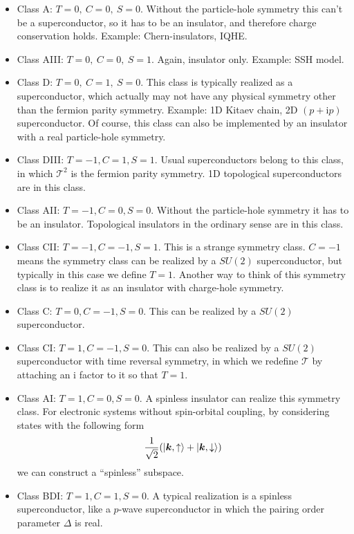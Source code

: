 \documentclass[hyperref, a4paper]{article}
\newcommand*{\ii}{\mathrm{i}}
\begin{document}
\begin{itemize}
    \item Class A: $T = 0, \  C = 0, \ S = 0$. Without the particle-hole symmetry this can't be a superconductor,
     so it has to be an insulator, and therefore charge conservation holds. Example: Chern-insulators, IQHE.
    \item Class AIII: $T = 0, \  C = 0, \ S = 1$. Again, insulator only. Example: SSH model. 
    \item Class D: $T = 0,\  C = 1, \ S = 0$. This class is typically realized as a superconductor,
    which actually may not have any physical symmetry other than the fermion parity symmetry.
    Example: 1D Kitaev chain, 2D $(p + \ii p)$ superconductor.
    Of course, this class can also be implemented by an insulator with a real particle-hole symmetry.
    \item Class DIII: $T=-1, C = 1, S = 1$. Usual superconductors belong to this class, in which 
    $\mathcal{T}^2$ is the fermion parity symmetry. 1D topological superconductors are in this class.
    \item Class AII: $T = -1, C = 0, S = 0$. Without the particle-hole symmetry it has to be an insulator.
    Topological insulators in the ordinary sense are in this class.
    \item Class CII: $T = -1, C = -1, S = 1$. This is a strange symmetry class. $C = -1$ means the 
    symmetry class can be realized by a $SU(2)$ superconductor, but typically in this case we define $T = 1$.
    Another way to think of this symmetry class is to realize it as an insulator with charge-hole symmetry.
    \item Class C: $T = 0, C = -1, S = 0$. This can be realized by a $SU(2)$ superconductor.
    \item Class CI: $T = 1, C = -1, S = 0$. This can also be realized by a $SU(2)$ superconductor with 
    time reversal symmetry, in which we redefine $\mathcal{T}$ by attaching an $\ii$ factor to it so that $T = 1$.
    \item Class AI: $T = 1, C = 0, S = 0$. A spinless insulator can realize this symmetry class. For electronic
    systems without spin-orbital coupling, by considering states with the following form 
    \[
        \frac{1}{\sqrt{2}}(\ket{\vb*{k}, \uparrow} + \ket{\vb*{k}, \downarrow})
    \]
    we can construct a ``spinless'' subspace.
    \item Class BDI: $T = 1, C = 1, S = 0$. A typical realization is a spinless superconductor, like a $p$-wave 
    superconductor in which the pairing order parameter $\Delta$ is real.
\end{itemize}



\end{document}
